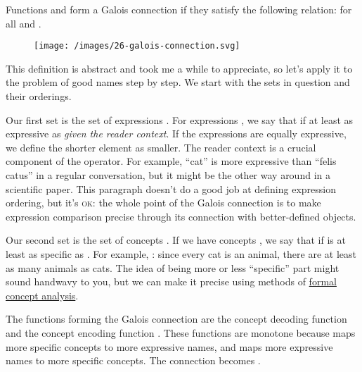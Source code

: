 \documentclass{article}
\begin{document}
Functions  and  form a Galois connection if they satisfy the following relation:
 for all  and .

\begin{figure}[grayscale-diagram,medium-size]
  \texttt{[image: /images/26-galois-connection.svg]}
\end{figure}

This definition is abstract and took me a while to appreciate, so let's apply it to the problem of good names step by step.
We start with the sets in question and their orderings.

Our first set is the set of expressions .
For expressions , we say that  if  at least as expressive as  \emph{given the reader context}.
If the expressions are equally expressive, we define the shorter element as smaller.
The reader context is a crucial component of the \math{\leq} operator.
For example, ``cat'' is more expressive than ``felis catus'' in a regular conversation, but it might be the other way around in a scientific paper.
This paragraph doesn't do a good job at defining expression ordering, but it's \textsc{ok}: the whole point of the Galois connection is to make expression comparison precise through its connection with better-defined objects.

Our second set is the set of concepts .
If we have concepts , we say that  if  is at least as specific as .
For example, : since every cat is an animal, there are at least as many animals as cats.
The idea of being more or less ``specific'' part might sound handwavy to you, but we can make it precise using methods of \href{https://en.wikipedia.org/wiki/Formal_concept_analysis}{formal concept analysis}.

The functions forming the Galois connection are the concept decoding function  and the concept encoding function .
These functions are monotone because  maps more specific concepts to more expressive names, and  maps more expressive names to more specific concepts.
The connection becomes .
\end{document}
